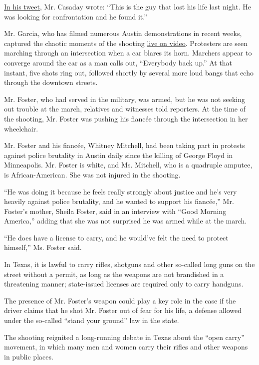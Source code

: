\href{https://twitter.com/KennethCasaday/status/1287373267318300674}{In
his tweet}, Mr. Casaday wrote: ``This is the guy that lost his life last
night. He was looking for confrontation and he found it.''

Mr. Garcia, who has filmed numerous Austin demonstrations in recent
weeks, captured the chaotic moments of the shooting
\href{https://www.facebookcorewwwi.onion/watch/live/?v=295346775139805\&ref=watch_permalink}{live
on video}. Protesters are seen marching through an intersection when a
car blares its horn. Marchers appear to converge around the car as a man
calls out, ``Everybody back up.'' At that instant, five shots ring out,
followed shortly by several more loud bangs that echo through the
downtown streets.

Mr. Foster, who had served in the military, was armed, but he was not
seeking out trouble at the march, relatives and witnesses told
reporters. At the time of the shooting, Mr. Foster was pushing his
fiancée through the intersection in her wheelchair.

Mr. Foster and his fiancée, Whitney Mitchell, had been taking part in
protests against police brutality in Austin daily since the killing of
George Floyd in Minneapolis. Mr. Foster is white, and Ms. Mitchell, who
is a quadruple amputee, is African-American. She was not injured in the
shooting.

``He was doing it because he feels really strongly about justice and
he's very heavily against police brutality, and he wanted to support his
fiancée,'' Mr. Foster's mother, Sheila Foster, said in an interview with
``Good Morning America,'' adding that she was not surprised he was armed
while at the march.

``He does have a license to carry, and he would've felt the need to
protect himself,'' Ms. Foster said.

In Texas, it is lawful to carry rifles, shotguns and other so-called
long guns on the street without a permit, as long as the weapons are not
brandished in a threatening manner; state-issued licenses are required
only to carry handguns.

The presence of Mr. Foster's weapon could play a key role in the case if
the driver claims that he shot Mr. Foster out of fear for his life, a
defense allowed under the so-called ``stand your ground'' law in the
state.

The shooting reignited a long-running debate in Texas about the ``open
carry'' movement, in which many men and women carry their rifles and
other weapons in public places.

